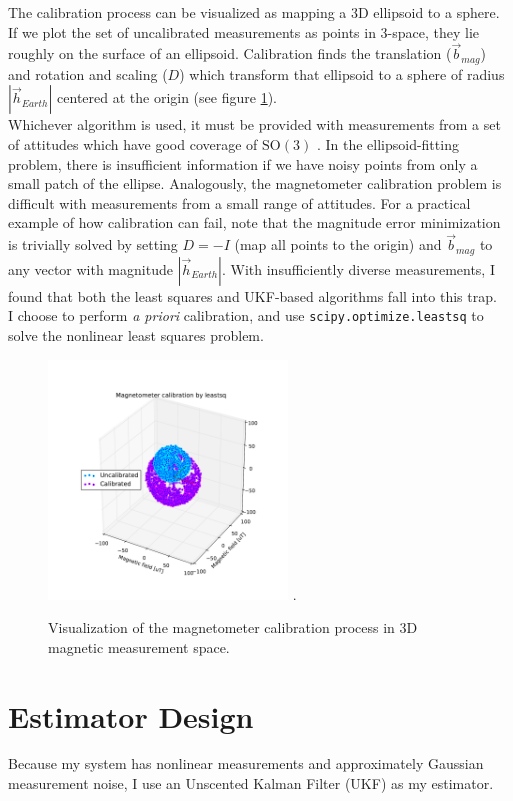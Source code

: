 \documentclass[conference]{IEEEtran}
\begin{document}
The calibration process can be visualized as mapping a 3D ellipsoid to a sphere. If we plot the set of uncalibrated measurements as points in 3-space, they lie roughly on the surface of an ellipsoid. Calibration finds the translation ($\vec{b}_{mag}$) and rotation and scaling ($D$) which transform that ellipsoid to a sphere of radius $|\vec{h}_{Earth}|$ centered at the origin (see figure \ref{fig:mag_cal}).\\

Whichever algorithm is used, it must be provided with measurements from a set of attitudes which have good coverage of $\mathrm{SO(3)}$ \cite{hardsoftiron}. In the ellipsoid-fitting problem, there is insufficient information if we have noisy points from only a small patch of the ellipse. Analogously, the magnetometer calibration problem is difficult with measurements from a small range of attitudes. For a practical example of how calibration can fail, note that the magnitude error minimization is trivially solved by setting $D = -I$ (map all points to the origin) and $\vec{b}_{mag}$ to any vector with magnitude $|\vec{h}_{Earth}|$. With insufficiently diverse measurements, I found that both the least squares and UKF-based algorithms fall into this trap.\\

I choose to perform \emph{a priori} calibration, and use \texttt{scipy.optimize.leastsq} to solve the nonlinear least squares problem.\\


\begin{figure}[!t]
  \centering
  \includegraphics[width=2.5in]{figures/mag_cal.pdf}
  \DeclareGraphicsExtensions.
  \caption{Visualization of the magnetometer calibration process in 3D magnetic measurement space.}
  \label{fig:mag_cal}
\end{figure}



\section{Estimator Design}
Because my system has nonlinear measurements and approximately Gaussian measurement noise, I use an Unscented Kalman Filter (UKF) as my estimator.
\end{document}
